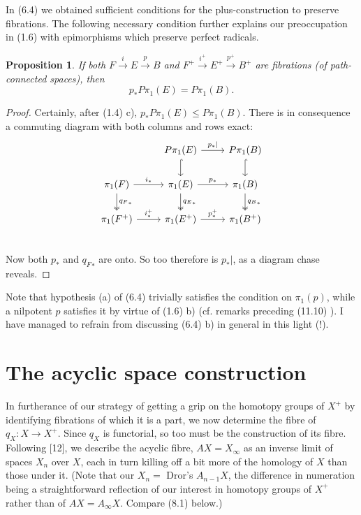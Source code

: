 \documentclass[openany,leqno]{book}  %
\newtheorem{prop}[theorem]{Proposition}
\begin{document}
In (6.4) we obtained sufficient conditions for the plus-construction to preserve fibrations.
The following necessary condition further explains our preoccupation in (1.6) with epimorphisms
which preserve perfect radicals.
\begin{prop}
	\label{6.8}If both $F\overset{i}{\longrightarrow} E\overset{p}{\longrightarrow} B$ and $F^+\overset{i^+}{\longrightarrow} E^+\overset{p^+}{\longrightarrow} B^+$ are fibrations (of path-connected spaces), then
\[p_*P\pi_1(E)=P\pi_1(B).\]
\end{prop}
\begin{proof}
 Certainly, after (1.4) c), $p_*P\pi_1(E)\leqslant P\pi_1(B)$. There is in consequence a commuting diagram with both columns and rows exact:
 \[
\begin{tikzcd}
  & P\pi_1(E) \arrow[r,"p_*|"] \arrow[d,hook] &  P\pi_1(B)\arrow[d,hook]  \\
 \pi_1(F) \arrow[r,"i_*"] \arrow[d,two heads,"{q_{F}}_*"] & \pi_1(E) \arrow[r,"p_*"]\arrow[d,two heads,"{q_{E}}_*"]  &  \pi_1(B) \arrow[d,two heads,"{q_{B}}_*"]  \\
 \pi_1(F^+) \arrow[r,"i_*^+"] & \pi_1(E^+) \arrow[r,"p_*^+"] &  \pi_1(B^+)  \\
\end{tikzcd}
 \]
Now both $p_*$ and ${q_F}_*$ are onto. So too therefore is $p_*|$, as a diagram chase reveals.
 \end{proof}
  
Note that hypothesis (a) of (6.4) trivially satisfies the condition on $\pi_1(p)$, while a nilpotent $p$ satisfies it by virtue of (1.6) b) (cf. remarks preceding (11.10) ). I have managed to refrain from discussing (6.4) b) in general in this light (!).




\chapter{The acyclic space construction} %
\label{cha:7the_acyclic_space_construction}

In furtherance of our strategy of getting a grip on the homotopy groups of $X^+$ by identifying fibrations of which it is a part, we now determine the fibre of $q_X \colon   X \longrightarrow X^+$. Since $q_X$ is functorial, so too must be the construction of its fibre. Following [12], we describe the acyclic fibre, $AX = X_\infty$ as an inverse limit of spaces $X_n$ over $X$, each in turn killing off a bit more of the homology of $X$ than those under it. (Note that our $X_n =$ Dror's $A_{n-1}X$, the difference in numeration being a straightforward reflection of our interest in homotopy groups of $X^+$ rather than of $AX = A_\infty X$. Compare (8.1) below.)
\end{document}

